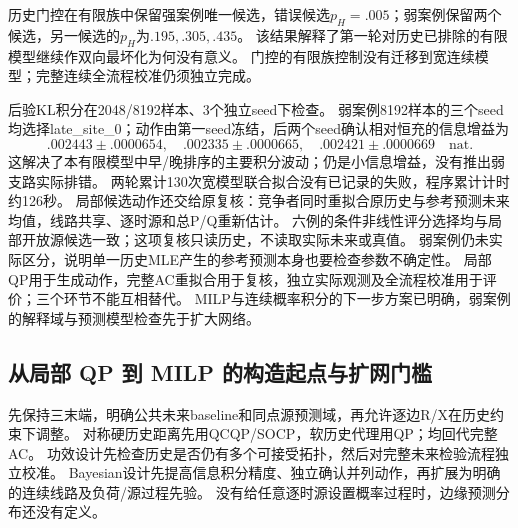 \documentclass[UTF8,fontset=fandol,11pt,a4paper]{ctexart}
\begin{document}
历史门控在有限族中保留强案例唯一候选，错误候选$p_H=.005$；弱案例保留两个候选，另一候选的$p_H$为$.195,.305,.435$。
该结果解释了第一轮对历史已排除的有限模型继续作双向最坏化为何没有意义。
门控的有限族控制没有迁移到宽连续模型；完整连续全流程校准仍须独立完成。

后验KL积分在2048/8192样本、3个独立seed下检查。
弱案例8192样本的三个seed均选择late\_site\_0；动作由第一seed冻结，后两个seed确认相对恒充的信息增益为
\[
 .002443\pm.0000654,\quad
 .002335\pm.0000665,\quad
 .002421\pm.0000669\quad\text{nat}.
\]
这解决了本有限模型中早/晚排序的主要积分波动；仍是小信息增益，没有推出弱支路实际排错。
两轮累计130次宽模型联合拟合没有已记录的失败，程序累计计时约126秒。
局部候选动作还交给原复核：竞争者同时重拟合原历史与参考预测未来均值，线路共享、逐时源和总P/Q重新估计。
六例的条件非线性评分选择均与局部开放源候选一致；这项复核只读历史，不读取实际未来或真值。
弱案例仍未实际区分，说明单一历史MLE产生的参考预测本身也要检查参数不确定性。
局部QP用于生成动作，完整AC重拟合用于复核，独立实际观测及全流程校准用于评价；三个环节不能互相替代。
MILP与连续概率积分的下一步方案已明确，弱案例的解释域与预测模型检查先于扩大网络。


\subsection{从局部 QP 到 MILP 的构造起点与扩网门槛}
先保持三末端，明确公共未来baseline和同点源预测域，再允许逐边R/X在历史约束下调整。
对称硬历史距离先用QCQP/SOCP，软历史代理用QP；均回代完整AC。
功效设计先检查历史是否仍有多个可接受拓扑，然后对完整未来检验流程独立校准。
Bayesian设计先提高信息积分精度、独立确认并列动作，再扩展为明确的连续线路及负荷/源过程先验。
没有给任意逐时源设置概率过程时，边缘预测分布还没有定义。
\end{document}
